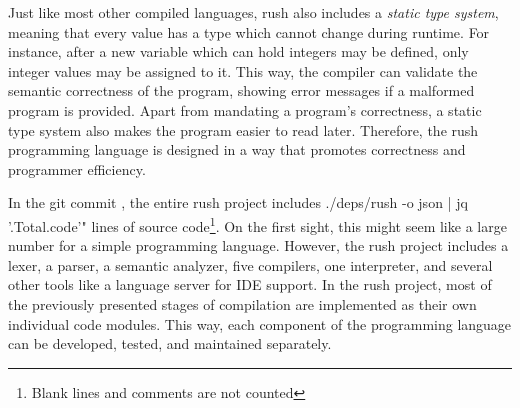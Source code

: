 Just like most other compiled languages, rush also includes a \emph{static type system},
meaning that every value has a type which cannot change during runtime.
For instance, after a new variable which can hold integers may be defined,
only integer values may be assigned to it. This way, the compiler can validate the semantic
correctness of the program, showing error messages if a malformed program is provided.
Apart from mandating a program's correctness, a static type system also makes the program easier to read later.
Therefore, the rush programming language is designed in a way that promotes correctness and programmer efficiency.

In the git commit \rushCommit, the entire rush project includes
 ./deps/rush -o json | jq '.Total.code'" lines of source code\footnote{Blank lines and comments are not counted}.
On the first sight, this might seem like a large number for a simple programming language.
However, the rush project includes a lexer, a parser, a semantic analyzer, five compilers, one interpreter, and several other tools like a language server for IDE support.
In the rush project, most of the previously presented stages of compilation are implemented as their own individual code modules.
This way, each component of the programming language can be developed, tested, and maintained separately.
